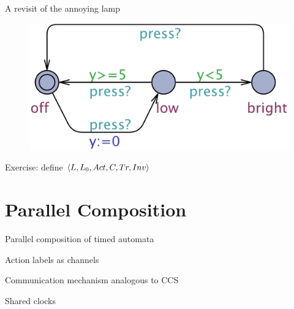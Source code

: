 \documentclass{beamer}
\begin{document}
\begin{frame}{A revisit of the annoying lamp}
  
\begin{figure}[htb]
  \centering
  \includegraphics[scale=0.35]{./images/Lamp.pdf}\\
\end{figure}

Exercise: define $\mathopen{\langle}L, L_0, Act, C, Tr, Inv\mathclose{\rangle}$ 

\end{frame}

\section{Parallel Composition}

\begin{frame}{Parallel composition of timed automata}

        Action labels as channels

        Communication mechanism analogous to CCS

        Shared clocks
\end{frame}
\end{document}
